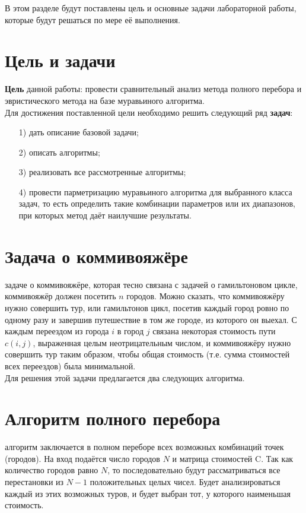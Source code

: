 В этом разделе будут поставлены цель и основные задачи лабораторной работы, которые будут решаться по мере её выполнения.

\section{Цель и задачи}
\qquad\textbf{Цель} данной работы: провести сравнительный анализ метода полного перебора и эвристического метода на базе муравьиного алгоритма.\\

Для достижения поставленной цели необходимо решить следующий ряд \textbf{задач}:
\begin{enumerate}
	\item[1)] дать описание базовой задачи;
	\item[2)] описать алгоритмы;
	\item[3)] реализовать все рассмотренные алгоритмы;
	\item[4)] провести парметризацию муравьиного алгоритма для выбранного класса задач, то есть определить такие комбинации параметров или их диапазонов, при которых метод даёт наилучшие результаты.
\end{enumerate}

\section{Задача о коммивояжёре}
 задаче о коммивояжёре, которая тесно связана с задачей о гамильтоновом цикле, коммивояжёр должен посетить $n$ городов. Можно сказать, что коммивояжёру нужно совершить тур, или гамильтонов цикл, посетив каждый город ровно по одному разу и завершив путешествие в том же городе, из которого он выехал. С каждым переездом из города $i$ в город $j$ связана некоторая стоимость пути $c(i, j)$, выраженная целым неотрицательным числом, и коммивояжёру нужно совершить тур таким образом, чтобы общая стоимость (т.е. сумма стоимостей всех переездов) была минимальной. \cite{cite_travsale}\\

Для решения этой задачи предлагается два следующих алгоритма.

\section{Алгоритм полного перебора}
 алгоритм заключается в полном переборе всех возможных комбинаций точек (городов). На вход подаётся число городов $N$ и матрица стоимостей C. Так как количество городов равно $N$, то последовательно будут рассматриваться все перестановки из $N - 1$ положительных целых чисел. Будет анализироваться каждый из этих возможных туров, и будет выбран тот, у которого наименьшая стоимость. \cite{Kormen}

